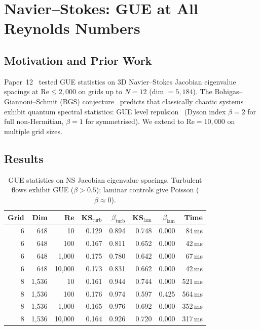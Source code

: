 \documentclass[11pt,a4paper]{article}
\begin{document}

\section{Navier--Stokes: GUE at All Reynolds Numbers}\label{sec:ns}

\subsection{Motivation and Prior Work}

Paper~12~\cite{dwr_papers} tested GUE statistics on 3D Navier--Stokes Jacobian eigenvalue spacings at $\mathrm{Re} \leq 2{,}000$ on grids up to $N = 12$ (dim $= 5{,}184$).
The Bohigas--Giannoni--Schmit (BGS) conjecture~\cite{bgs1984,u24_ns} predicts that classically chaotic systems exhibit quantum spectral statistics: GUE level repulsion~\cite{mehta2004,wigner1957} (Dyson index $\beta = 2$ for full non-Hermitian, $\beta = 1$ for symmetrised).
We extend to $\mathrm{Re} = 10{,}000$ on multiple grid sizes.

\subsection{Results}

\begin{table}[H]
\centering
\caption{GUE statistics on NS Jacobian eigenvalue spacings. Turbulent flows exhibit GUE ($\beta > 0.5$); laminar controls give Poisson ($\beta \approx 0$).}
\label{tab:ns}
\small
\begin{tabular}{rrrrrrrr}
\toprule
\textbf{Grid} & \textbf{Dim} & \textbf{Re} & \textbf{KS$_{\mathrm{turb}}$} & \textbf{$\beta_{\mathrm{turb}}$} & \textbf{KS$_{\mathrm{lam}}$} & \textbf{$\beta_{\mathrm{lam}}$} & \textbf{Time}\\
\midrule
6 & 648 & 10 & 0.129 & 0.894 & 0.748 & 0.000 & 84\,ms\\
6 & 648 & 100 & 0.167 & 0.811 & 0.652 & 0.000 & 42\,ms\\
6 & 648 & 1{,}000 & 0.175 & 0.780 & 0.642 & 0.000 & 67\,ms\\
6 & 648 & 10{,}000 & 0.173 & 0.831 & 0.662 & 0.000 & 42\,ms\\
8 & 1{,}536 & 10 & 0.161 & 0.944 & 0.744 & 0.000 & 521\,ms\\
8 & 1{,}536 & 100 & 0.176 & 0.974 & 0.597 & 0.425 & 564\,ms\\
8 & 1{,}536 & 1{,}000 & 0.165 & 0.976 & 0.692 & 0.000 & 352\,ms\\
8 & 1{,}536 & 10{,}000 & 0.164 & 0.926 & 0.720 & 0.000 & 317\,ms\\
\bottomrule
\end{tabular}
\end{table}
\end{document}

